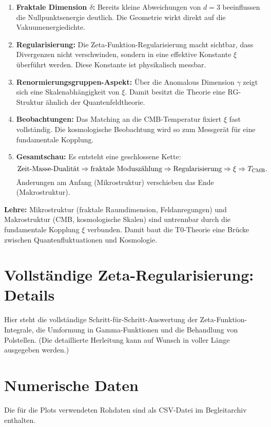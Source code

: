 \documentclass[12pt,a4paper]{article}
\begin{document}
	\begin{enumerate}
		\item \textbf{Fraktale Dimension $\delta$:} Bereits kleine Abweichungen von $d=3$ beeinflussen die Nullpunktsenergie deutlich. Die Geometrie wirkt direkt auf die Vakuumenergiedichte.
		\item \textbf{Regularisierung:} Die Zeta-Funktion-Regularisierung macht sichtbar, dass Divergenzen nicht verschwinden, sondern in eine effektive Konstante $\xi$ überführt werden. Diese Konstante ist physikalisch messbar.
		\item \textbf{Renormierungsgruppen-Aspekt:} Über die Anomalous Dimension $\gamma$ zeigt sich eine Skalenabhängigkeit von $\xi$. Damit besitzt die Theorie eine RG-Struktur ähnlich der Quantenfeldtheorie.
		\item \textbf{Beobachtungen:} Das Matching an die CMB-Temperatur fixiert $\xi$ fast vollständig. Die kosmologische Beobachtung wird so zum Messgerät für eine fundamentale Kopplung.
		\item \textbf{Gesamtschau:} Es entsteht eine geschlossene Kette:
		\[
		\text{Zeit-Masse-Dualität} \Rightarrow \text{fraktale Moduszählung}
		\Rightarrow \text{Regularisierung}
		\Rightarrow \xi
		\Rightarrow T_{\rm CMB}.
		\]
		Änderungen am Anfang (Mikrostruktur) verschieben das Ende (Makrostruktur).
	\end{enumerate}
	
	\textbf{Lehre:} Mikrostruktur (fraktale Raumdimension, Feldanregungen) und Makrostruktur (CMB, kosmologische Skalen) sind untrennbar durch die fundamentale Kopplung $\xi$ verbunden. Damit baut die T0-Theorie eine Brücke zwischen Quantenfluktuationen und Kosmologie.
	
	\appendix
	\section{Vollständige Zeta-Regularisierung: Details}
	\label{app:zeta_full}
	
	Hier steht die vollständige Schritt-für-Schritt-Auswertung der Zeta-Funktion-Integrale, die Umformung in Gamma-Funktionen und die Behandlung von Polstellen. (Die detaillierte Herleitung kann auf Wunsch in voller Länge ausgegeben werden.)
	
	\section{Numerische Daten}
	Die für die Plots verwendeten Rohdaten sind als CSV-Datei im Begleitarchiv enthalten.
	
\end{document}
